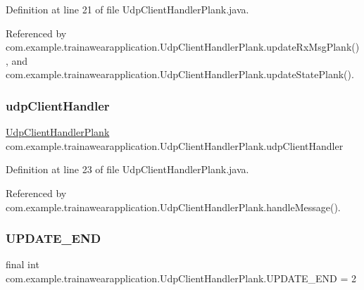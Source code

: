 Definition at line 21 of file Udp\+Client\+Handler\+Plank.\+java.



Referenced by com.\+example.\+trainawearapplication.\+Udp\+Client\+Handler\+Plank.\+update\+Rx\+Msg\+Plank(), and com.\+example.\+trainawearapplication.\+Udp\+Client\+Handler\+Plank.\+update\+State\+Plank().

\mbox{\label{classcom_1_1example_1_1trainawearapplication_1_1_udp_client_handler_plank_a3d0b57ac9851760ca266fcc7ba6ddad1}} 
\subsubsection{\texorpdfstring{udpClientHandler}{udpClientHandler}}
{\footnotesize\ttfamily \mbox{\hyperlink{classcom_1_1example_1_1trainawearapplication_1_1_udp_client_handler_plank}{Udp\+Client\+Handler\+Plank}} com.\+example.\+trainawearapplication.\+Udp\+Client\+Handler\+Plank.\+udp\+Client\+Handler\hspace{0.3cm}{\ttfamily [package]}}



Definition at line 23 of file Udp\+Client\+Handler\+Plank.\+java.



Referenced by com.\+example.\+trainawearapplication.\+Udp\+Client\+Handler\+Plank.\+handle\+Message().

\mbox{\label{classcom_1_1example_1_1trainawearapplication_1_1_udp_client_handler_plank_a75f364bd8c7c31476d6f9d2b621765c8}} 
\subsubsection{\texorpdfstring{UPDATE\_END}{UPDATE\_END}}
{\footnotesize\ttfamily final int com.\+example.\+trainawearapplication.\+Udp\+Client\+Handler\+Plank.\+U\+P\+D\+A\+T\+E\+\_\+\+E\+ND = 2\hspace{0.3cm}{\ttfamily [static]}}



